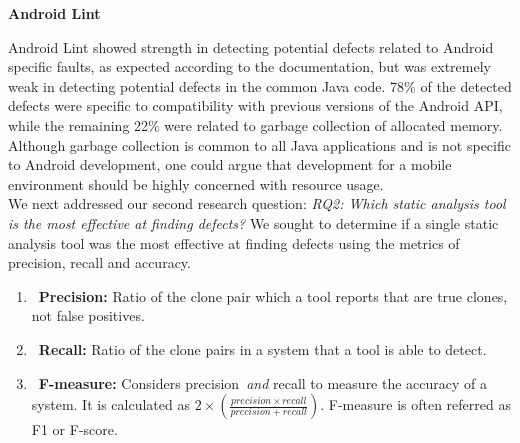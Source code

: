 \documentclass{sig-alternate}
\begin{document}
\noindent
\textbf{Android Lint}

Android Lint showed strength in detecting potential defects related to Android specific faults, as expected according to the documentation, but was extremely weak in detecting potential defects in the common Java code. 78\% of the detected defects were specific to compatibility with previous versions of the Android API, while the remaining 22\% were related to garbage collection of allocated memory. Although garbage collection is common to all Java applications and is not specific to Android development, one could argue that development for a mobile environment should be highly concerned with resource usage.\\

We next addressed our second research question:
\emph{RQ2: Which static analysis tool is the most effective at finding defects?}
We sought to determine if a single static analysis tool was the most effective at finding defects using the metrics of precision, recall and accuracy.

\begin{enumerate}
   \setlength{\itemsep}{0pt} %
   \setlength{\parskip}{0pt} %
   \setlength{\parsep}{0pt}  %

  \item~\textbf{Precision:} Ratio of the clone pair which a tool reports that are true clones, not false positives. %

 \item~\textbf{Recall:} Ratio of the clone pairs in a system that a tool is able to detect. %

  \item~\textbf{F-measure:} Considers precision~\emph{and} recall to measure the accuracy of a system. It is calculated as $2\times(\frac{precision\times recall}{precision+recall})$. F-measure is often referred as F1 or F-score.


\end{enumerate}
\end{document}
